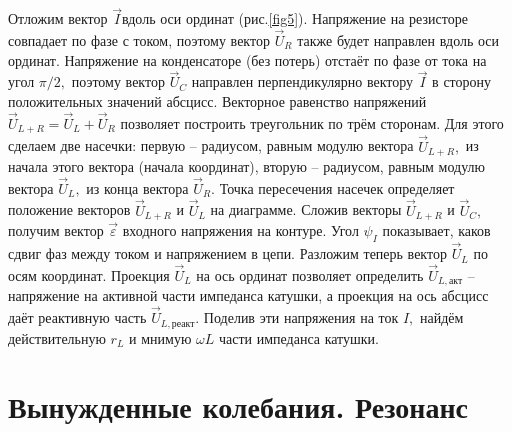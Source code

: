 {Отложим вектор $\vec I$вдоль оси ординат (рис.\ref{fig5}). Напряжение на резисторе совпадает по фазе с током, поэтому вектор $\vec U_R$ также будет направлен вдоль оси ординат. Напряжение на конденсаторе (без потерь) отстаёт по фазе от тока на угол $\pi/2,$ поэтому вектор $\vec U_C$ направлен перпендикулярно вектору $\vec I$ в сторону положительных значений абсцисс. Векторное равенство напряжений $\vec U_{L+R}=\vec U_L+\vec U_R$ позволяет построить треугольник по трём сторонам. Для этого сделаем две насечки: первую – радиусом, равным модулю вектора $\vec U_{L+R},$ из начала этого вектора (начала координат), вторую – радиусом, равным модулю вектора $\vec U_L,$ из конца вектора $\vec U_R.$ Точка пересечения насечек определяет положение векторов $\vec U_{L+R}$ и $\vec U_L$ на диаграмме. Сложив векторы $\vec U_{L+R}$ и $\vec U_C,$ получим вектор $\vec\varepsilon$ входного напряжения на контуре. Угол $\psi_I$ показывает, каков сдвиг фаз между током и напряжением в цепи. Разложим теперь вектор $\vec U_L$ по осям координат. Проекция $\vec U_L$ на ось ординат позволяет определить $\vec U_{L,\text{акт}}$ – напряжение на активной части импеданса катушки, а проекция на ось абсцисс даёт реактивную часть $\vec U_{L,\text{реакт}}.$ Поделив эти напряжения на ток $I,$ найдём действительную $r_L$ и мнимую $\omega L$ части импеданса катушки.

\section{Вынужденные колебания. Резонанс}
}
